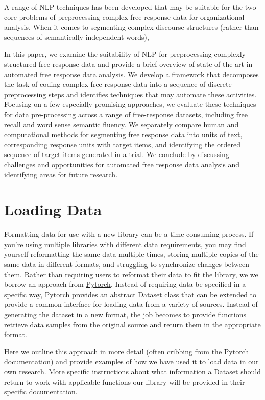 \documentclass[
  letterpaper,
  DIV=11,
  numbers=noendperiod]{scrreprt}
\begin{document}
A range of NLP techniques has been developed that may be suitable for
the two core problems of preprocessing complex free response data for
organizational analysis. When it comes to segmenting complex discourse
structures (rather than sequences of semantically independent words),

In this paper, we examine the suitability of NLP for preprocessing
complexly structured free response data and provide a brief overview of
state of the art in automated free response data analysis. We develop a
framework that decomposes the task of coding complex free response data
into a sequence of discrete preprocessing steps and identifies
techniques that may automate these activities. Focusing on a few
especially promising approaches, we evaluate these techniques for data
pre-processing across a range of free-response datasets, including free
recall and word sense semantic fluency. We separately compare human and
computational methods for segmenting free response data into units of
text, corresponding response units with target items, and identifying
the ordered sequence of target items generated in a trial. We conclude
by discussing challenges and opportunities for automated free response
data analysis and identifying areas for future research.


\hypertarget{loading-data}{%
\chapter{Loading Data}\label{loading-data}}

Formatting data for use with a new library can be a time consuming
process. If you're using multiple libraries with different data
requirements, you may find yourself reformatting the same data multiple
times, storing multiple copies of the same data in different formats,
and struggling to synchronize changes between them. Rather than
requiring users to reformat their data to fit the library, we we borrow
an approach from \href{https://pytorch.org/}{Pytorch}. Instead of
requiring data be specified in a specific way, Pytorch provides an
abstract Dataset class that can be extended to provide a common
interface for loading data from a variety of sources. Instead of
generating the dataset in a new format, the job becomes to provide
functions retrieve data samples from the original source and return them
in the appropriate format.

Here we outline this approach in more detail (often cribbing from the
Pytorch documentation) and provide examples of how we have used it to
load data in our own research. More specific instructions about what
information a Dataset should return to work with applicable functions
our library will be provided in their specific documentation.
\end{document}

